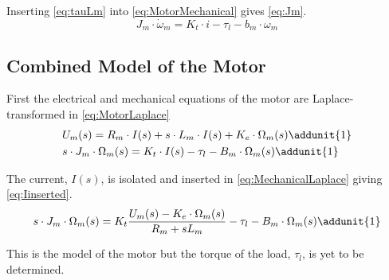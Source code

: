 \startexplain
\stopexplain

Inserting \autoref{eq:tauLm} into \autoref{eq:MotorMechanical} gives \autoref{eq:Jm}.
\begin{equation}
	J_{m} \cdot \dot{\omega}_{m} = K_{t} \cdot i - \tau_{l} - b_{m} \cdot \omega_{m} \label{eq:Jm}
\end{equation}

\subsection*{Combined Model of the Motor}
First the electrical and mechanical equations of the motor are Laplace-transformed in \autoref{eq:MotorLaplace}
\begin{subequations}\label{eq:MotorLaplace}
	\begin{flalign}
		&U_{m}(s) = R_{m} \cdot I(s) + s \cdot L_{m} \cdot I(s) + K_{e} \cdot \Omega_{m}(s) \addunit{1} \label{eq:ElectricalLaplace}\\	
		&s\cdot J_{m} \cdot \Omega_{m}(s) = K_{t} \cdot I(s) - \tau_{l} - B_{m} \cdot \Omega_{m}(s) \addunit{1}	\label{eq:MechanicalLaplace}
	\end{flalign}
\end{subequations}


The current, $I(s)$, is isolated and inserted in \autoref{eq:MechanicalLaplace} giving \autoref{eq:Iinserted}.
\begin{equation}
	s\cdot J_{m} \cdot \Omega_{m}(s) = K_{t} \frac{U_m(s)-K_e\cdot\Omega_{m}(s)}{R_m+sL_m} - \tau_{l} - B_{m} \cdot \Omega_{m}(s) \addunit{1}
	\label{eq:Iinserted}	
\end{equation}

This is the model of the motor but the torque of the load, $\tau_l$, is yet to be determined.